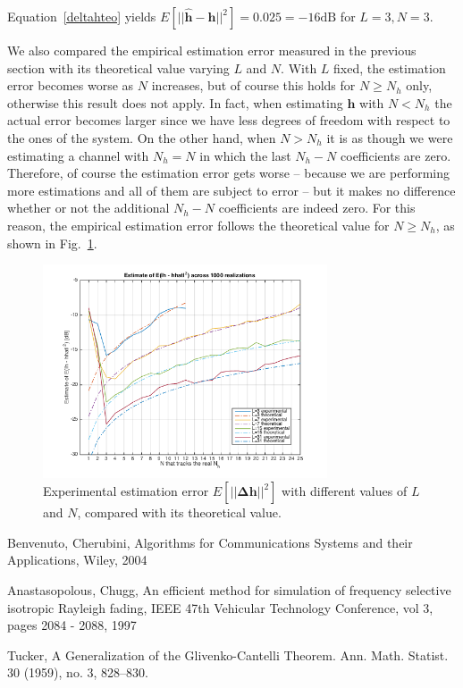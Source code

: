 \documentclass[10pt]{article}
\newcommand{\dB} {\mathrm{dB}}
\begin{document}
Equation~\ref{deltahteo} yields $E[||\mathbf{\hat{h}}-\mathbf{h}||^2] = 0.025 = -16 \dB$ for $L=3, N=3$.

We also compared the empirical estimation error measured in the previous section with its theoretical value varying $L$ and $N$. With $L$ fixed, the estimation error becomes worse as $N$ increases, but of course this holds for $N \geq N_h$ only, otherwise this result does not apply. In fact, when estimating $\mathbf{h}$ with $N<N_h$ the actual error becomes larger since we have less degrees of freedom with respect to the ones of the system. On the other hand, when $N > N_h$ it is as though we were estimating a channel with $N_h = N$ in which the last $N_h - N$ coefficients are zero. Therefore, of course the estimation error gets worse -- because we are performing more estimations and all of them are subject to error -- but it makes no difference whether or not the additional $N_h - N$ coefficients are indeed zero. For this reason, the empirical estimation error follows the theoretical value for $N \geq N_h$, as shown in Fig.~\ref{fig:p02_comparetheoreticaldeltah}.

\begin{figure}[ht]
	\centering
	\includegraphics[width=0.75\textwidth]{p02_comparetheoreticaldeltah}
	\caption{Experimental estimation error $E[||\mathbf{\Delta h}||^2]$ with different values of $L$ and $N$, compared with its theoretical value.}
    \label{fig:p02_comparetheoreticaldeltah}
\end{figure}


\begin{thebibliography}{10}

Benvenuto, Cherubini, Algorithms for Communications Systems and their Applications, Wiley, 2004

Anastasopolous, Chugg, An efficient method for simulation of frequency selective isotropic Rayleigh fading, IEEE 47th Vehicular Technology Conference, vol 3, pages 2084 - 2088, 1997

Tucker, A Generalization of the Glivenko-Cantelli Theorem. Ann. Math. Statist. 30 (1959), no. 3, 828--830.

\end{thebibliography}
\end{document}
